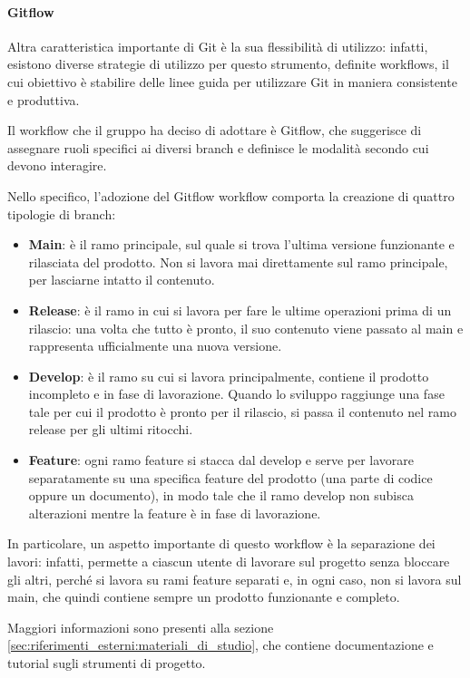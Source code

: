 \paragraph{Gitflow}
Altra caratteristica importante di Git è la sua flessibilità di utilizzo: infatti, esistono diverse strategie di utilizzo per questo strumento, definite workflows, il cui obiettivo è stabilire delle linee guida per utilizzare Git in maniera consistente e produttiva.
\par Il workflow che il gruppo ha deciso di adottare è Gitflow, che suggerisce di assegnare ruoli specifici ai diversi branch e definisce le modalità secondo cui devono interagire.
\par Nello specifico, l'adozione del Gitflow workflow comporta la creazione di quattro tipologie di branch:
\begin{itemize}
    \item \textbf{Main}: è il ramo principale, sul quale si trova l'ultima versione funzionante e rilasciata del prodotto. Non si lavora mai direttamente sul ramo principale, per lasciarne intatto il contenuto.
    \item \textbf{Release}: è il ramo in cui si lavora per fare le ultime operazioni prima di un rilascio: una volta che tutto è pronto, il suo contenuto viene passato al main e rappresenta ufficialmente una nuova versione.
    \item \textbf{Develop}: è il ramo su cui si lavora principalmente, contiene il prodotto incompleto e in fase di lavorazione. Quando lo sviluppo raggiunge una fase tale per cui il prodotto è pronto per il rilascio, si passa il contenuto nel ramo release per gli ultimi ritocchi.
    \item \textbf{Feature}: ogni ramo feature si stacca dal develop e serve per lavorare separatamente su una specifica feature del prodotto (una parte di codice oppure un documento), in modo tale che il ramo develop non subisca alterazioni mentre la feature è in fase di lavorazione.
\end{itemize}
In particolare, un aspetto importante di questo workflow è la separazione dei lavori: infatti, permette a ciascun utente di lavorare sul progetto senza bloccare gli altri, perché si lavora su rami feature separati e, in ogni caso, non si lavora sul main, che quindi contiene sempre un prodotto funzionante e completo.
\par Maggiori informazioni sono presenti alla sezione \ref{sec:riferimenti_esterni:materiali_di_studio}, che contiene documentazione e tutorial sugli strumenti di progetto.


